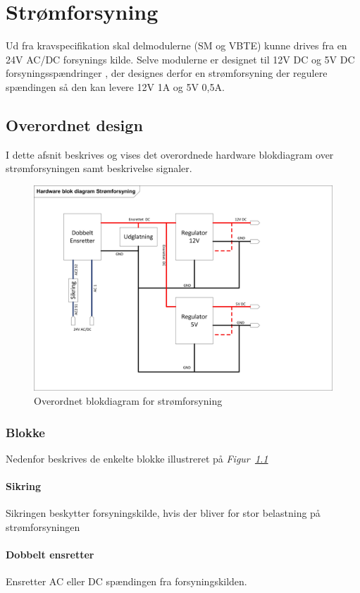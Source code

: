 \chapter{Strømforsyning}
Ud fra kravspecifikation skal delmodulerne (SM og VBTE) kunne drives fra en 24V AC/DC forsynings kilde. Selve modulerne er designet til 12V DC og 5V DC forsyningsspændringer , der designes derfor en strømforsyning der regulere spændingen så den kan levere 12V 1A og 5V 0,5A.  

\section{Overordnet design}
I dette afsnit beskrives og vises det overordnede hardware blokdiagram over strømforsyningen samt beskrivelse signaler.

\begin{figure}[H]
\centering
\includegraphics[width=1\textwidth]{billeder/PowerSupplyBlok}
\caption{Overordnet blokdiagram for strømforsyning}
\label{fig:PowerSubbly Blok}
\end{figure}
\newpage
\subsection{Blokke}
Nedenfor beskrives de enkelte blokke illustreret på \textit{Figur~\ref{fig:PowerSubbly Blok}}
\subsubsection{Sikring}
Sikringen beskytter forsyningskilde, hvis der bliver for stor belastning på strømforsyningen
\subsubsection{Dobbelt ensretter}
Ensretter AC eller DC spændingen fra forsyningskilden.
